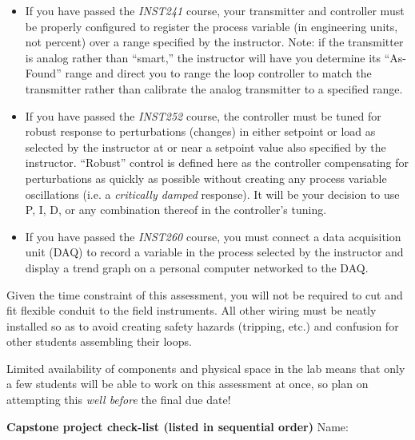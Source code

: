 \begin{itemize}
\item{} If you have passed the {\it INST241} course, your transmitter and controller must be properly configured to register the process variable (in engineering units, not percent) over a range specified by the instructor.  Note: if the transmitter is analog rather than ``smart,'' the instructor will have you determine its ``As-Found'' range and direct you to range the loop controller to match the transmitter rather than calibrate the analog transmitter to a specified range.
\vskip 5pt
\item{} If you have passed the {\it INST252} course, the controller must be tuned for robust response to perturbations (changes) in either setpoint or load as selected by the instructor at or near a setpoint value also specified by the instructor.  ``Robust'' control is defined here as the controller compensating for perturbations as quickly as possible without creating any process variable oscillations (i.e. a {\it critically damped} response).  It will be your decision to use P, I, D, or any combination thereof in the controller's tuning.
\vskip 5pt
\item{} If you have passed the {\it INST260} course, you must connect a data acquisition unit (DAQ) to record a variable in the process selected by the instructor and display a trend graph on a personal computer networked to the DAQ.
\end{itemize}

\vskip 10pt

Given the time constraint of this assessment, you will not be required to cut and fit flexible conduit to the field instruments.  All other wiring must be neatly installed so as to avoid creating safety hazards (tripping, etc.) and confusion for other students assembling their loops.

Limited availability of components and physical space in the lab means that only a few students will be able to work on this assessment at once, so plan on attempting this {\it well before} the final due date!











\vfil \eject

\noindent
\centerline{{\bf Capstone project check-list (listed in sequential order)} \hskip 50pt Name: \underbar{\hskip 80pt}}

